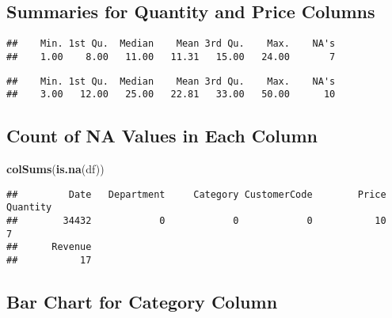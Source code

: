 \documentclass[
]{article}
\newenvironment{Shaded}{\begin{snugshade}}{\end{snugshade}}
\newcommand{\FunctionTok}[1]{\textcolor[rgb]{0.13,0.29,0.53}{\textbf{#1}}}
\newcommand{\NormalTok}[1]{#1}
\newcommand{\SpecialCharTok}[1]{\textcolor[rgb]{0.81,0.36,0.00}{\textbf{#1}}}
\begin{document}
\subsection{Summaries for Quantity and Price
Columns}\label{summaries-for-quantity-and-price-columns}

\begin{Shaded}
\end{Shaded}

\begin{verbatim}
##    Min. 1st Qu.  Median    Mean 3rd Qu.    Max.    NA's 
##    1.00    8.00   11.00   11.31   15.00   24.00       7
\end{verbatim}

\begin{Shaded}
\end{Shaded}

\begin{verbatim}
##    Min. 1st Qu.  Median    Mean 3rd Qu.    Max.    NA's 
##    3.00   12.00   25.00   22.81   33.00   50.00      10
\end{verbatim}

\subsection{Count of NA Values in Each
Column}\label{count-of-na-values-in-each-column}

\begin{Shaded}
\begin{Highlighting}[]
\FunctionTok{colSums}\NormalTok{(}\FunctionTok{is.na}\NormalTok{(df))}
\end{Highlighting}
\end{Shaded}

\begin{verbatim}
##         Date   Department     Category CustomerCode        Price     Quantity 
##        34432            0            0            0           10            7 
##      Revenue 
##           17
\end{verbatim}

\subsection{Bar Chart for Category
Column}\label{bar-chart-for-category-column}
\end{document}
